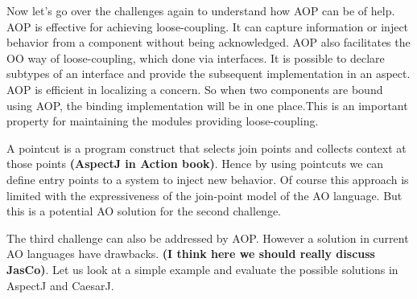 \documentclass{llncs}
\begin{document}
Now let's go over the challenges again to understand how AOP can be of help.
AOP is effective for achieving loose-coupling. It
can capture information or inject behavior from a component without being
acknowledged. AOP also facilitates the OO way of loose-coupling, which done via
interfaces. It is possible to declare subtypes of an interface and provide the
subsequent implementation in an aspect.  AOP is efficient in localizing a concern. So when two components are bound using
AOP, the binding implementation will be in one place.This is an important
property for maintaining the modules providing loose-coupling. 

A pointcut is a program construct that selects join points and collects context at
those points \textbf{(AspectJ in Action book)}. Hence by using pointcuts we can
define entry points to a system to inject new behavior. Of course this approach
is limited with the expressiveness of the join-point model of the AO language.
But this is a potential AO solution for the second challenge.

The third challenge can also be addressed by AOP. However a solution in current
AO languages have drawbacks. \textbf{(I think here we should really discuss
JasCo)}. Let us look at a simple example and evaluate the possible solutions in
AspectJ and CaesarJ. 
\end{document}
